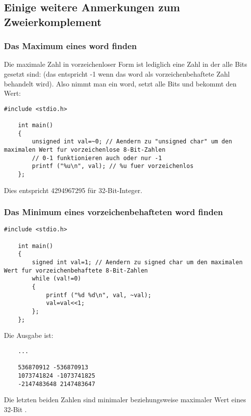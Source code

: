 \subsection{Einige weitere Anmerkungen zum Zweierkomplement}

\subsubsection{Das Maximum eines \gls{word} finden}
Die maximale Zahl in vorzeichenloser Form ist lediglich eine Zahl in der alle
Bits gesetzt sind: 
(das entspricht -1 wenn das \gls{word} als vorzeichenbehaftete Zahl behandelt wird).
Also nimmt man ein \gls{word}, setzt alle Bits und bekommt den Wert:

\begin{lstlisting}[style=customc]
	#include <stdio.h>

	int main()
	{
		unsigned int val=~0; // Aendern zu "unsigned char" um den maximalen Wert fur vorzeichenlose 8-Bit-Zahlen
		// 0-1 funktionieren auch oder nur -1
		printf ("%u\n", val); // %u fuer vorzeichenlos
	};
\end{lstlisting}

Dies entspricht 4294967295 für 32-Bit-Integer.

\subsubsection{Das Minimum eines vorzeichenbehafteten \gls{word} finden}



\begin{lstlisting}[style=customc]
	#include <stdio.h>

	int main()
	{
		signed int val=1; // Aendern zu signed char um den maximalen Wert fur vorzeichenbehaftete 8-Bit-Zahlen
		while (val!=0)
		{
			printf ("%d %d\n", val, ~val);
			val=val<<1;
		};
	};
\end{lstlisting}

Die Ausgabe ist:

\begin{lstlisting}
	...

	536870912 -536870913
	1073741824 -1073741825
	-2147483648 2147483647
\end{lstlisting}

Die letzten beiden Zahlen sind minimaler beziehungsweise maximaler Wert eines 32-Bit .
